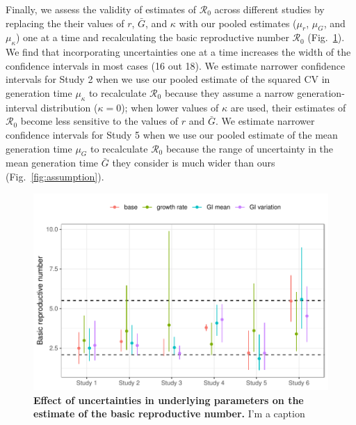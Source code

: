\documentclass[12pt]{article}
\newcommand{\eref}[1]{(\ref{eq:#1})}
\newcommand{\fref}[1]{Fig.~\ref{fig:#1}}
\begin{document}
Finally, we assess the validity of estimates of $\mathcal R_0$ across different studies by 
replacing the their values of $r$, $\bar G$, and $\kappa$ with our pooled estimates ($\mu_r$, $\mu_G$, and $\mu_\kappa$) one at a time and recalculating the basic reproductive number $\mathcal R_0$ (\fref{R0}).
We find that incorporating uncertainties one at a time increases the width of the confidence intervals in most cases (16 out 18).
We estimate narrower confidence intervals for Study 2 when we use our pooled estimate of the squared CV in generation time $\mu_\kappa$ to recalculate $\mathcal R_0$ because they assume a narrow generation-interval distribution ($\kappa=0$);
when lower values of $\kappa$ are used, their estimates of $\mathcal R_0$ become less sensitive to the values of $r$ and $\bar G$.
We estimate narrower confidence intervals for Study 5 when we use our pooled estimate of the mean generation time $\mu_G$ to recalculate $\mathcal R_0$ because the range of uncertainty in the mean generation time $\bar G$ they consider is much wider than ours (\fref{assumption}).


\begin{figure}[t]
\includegraphics[width=\textwidth]{compare_R0.pdf}
\caption{
\textbf{Effect of uncertainties in underlying parameters on the estimate of the basic reproductive number.}
I'm a caption
}
\label{fig:R0}
\end{figure}
\end{document}
